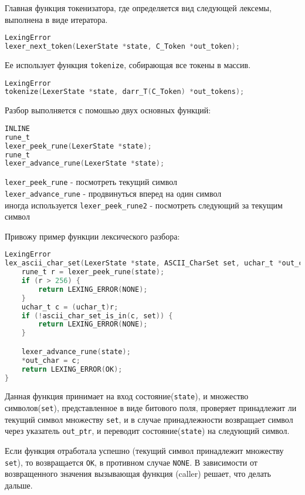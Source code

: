 Главная функция токенизатора, где определяется вид следующей лексемы, выполнена в виде итератора.

\begin{lstlisting}[language=c]
LexingError
lexer_next_token(LexerState *state, C_Token *out_token);
\end{lstlisting}

Ее использует функция \verb|tokenize|, собирающая все токены в массив.
\begin{lstlisting}[language=c]
LexingError
tokenize(LexerState *state, darr_T(C_Token) *out_tokens);
\end{lstlisting}

Разбор выполняется с помошью двух основных функций:
\begin{lstlisting}[language=c]
INLINE
rune_t
lexer_peek_rune(LexerState *state);
rune_t
lexer_advance_rune(LexerState *state);
\end{lstlisting}

\verb|lexer_peek_rune| - посмотреть текущий символ \\
\verb|lexer_advance_rune| - продвинуться вперед на один символ \\
иногда используется \verb|lexer_peek_rune2| - посмотреть следующий за текущим символ

Привожу пример функции лексического разбора:
\begin{lstlisting}[language=c, caption={Пример функции лексического разбора}, label={lexing:fn-ex}]
LexingError
lex_ascii_char_set(LexerState *state, ASCII_CharSet set, uchar_t *out_char) {
    rune_t r = lexer_peek_rune(state);
    if (r > 256) {
        return LEXING_ERROR(NONE);
    }
    uchar_t c = (uchar_t)r;
    if (!ascii_char_set_is_in(c, set)) {
        return LEXING_ERROR(NONE);
    }

    lexer_advance_rune(state);
    *out_char = c;
    return LEXING_ERROR(OK);
}
\end{lstlisting}

Данная функция принимает на вход состояние(\verb|state|), и множество символов(\verb|set|), представленное в виде битового поля,
проверяет принадлежит ли текущий символ множеству \verb|set|, и в случае принадлежности возвращает символ через указатель \verb|out_ptr|,
и переводит состояние(\verb|state|) на следующий символ.

Если функция отработала успешно (текущий символ принадлежит множеству \verb|set|), то возвращается \verb|OK|, в противном случае \verb|NONE|.
В зависимости от возвращенного значения вызывающая функция (caller) решает, что делать дальше.


